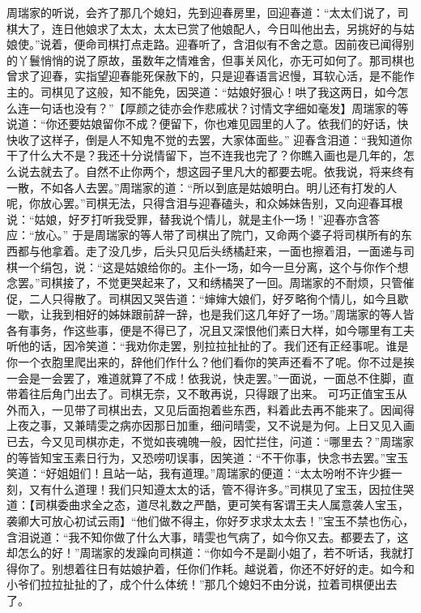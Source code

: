 \documentclass[12pt,oneside]{book}
\begin{document}
周瑞家的听说，会齐了那几个媳妇，先到迎春房里，回迎春道：“太太们说了，司棋大了，连日他娘求了太太，太太已赏了他娘配人，今日叫他出去，另挑好的与姑娘使。”说着，便命司棋打点走路。迎春听了，含泪似有不舍之意。因前夜已闻得别的丫鬟悄悄的说了原故，虽数年之情难舍，但事关风化，亦无可如何了。那司棋也曾求了迎春，实指望迎春能死保赦下的，只是迎春语言迟慢，耳软心活，是不能作主的。司棋见了这般，知不能免，因哭道：“姑娘好狠心！哄了我这两日，如今怎么连一句话也没有？”【厚颜之徒亦会作悲戚状？讨情文字细如毫发】周瑞家的等说道：“你还要姑娘留你不成？便留下，你也难见园里的人了。依我们的好话，快快收了这样子，倒是人不知鬼不觉的去罢，大家体面些。”
迎春含泪道：“我知道你干了什么大不是？我还十分说情留下，岂不连我也完了？你瞧入画也是几年的，怎么说去就去了。自然不止你两个，想这园子里凡大的都要去呢。依我说，将来终有一散，不如各人去罢。”周瑞家的道：“所以到底是姑娘明白。明儿还有打发的人呢，你放心罢。”司棋无法，只得含泪与迎春磕头，和众姊妹告别，又向迎春耳根说：“姑娘，好歹打听我受罪，替我说个情儿，就是主仆一场！”迎春亦含答应：“放心。”
于是周瑞家的等人带了司棋出了院门，又命两个婆子将司棋所有的东西都与他拿着。走了没几步，后头只见后头绣橘赶来，一面也擦着泪，一面递与司棋一个绢包，说：“这是姑娘给你的。主仆一场，如今一旦分离，这个与你作个想念罢。”司棋接了，不觉更哭起来了，又和绣橘哭了一回。周瑞家的不耐烦，只管催促，二人只得散了。司棋因又哭告道：“婶婶大娘们，好歹略徇个情儿，如今且歇一歇，让我到相好的姊妹跟前辞一辞，也是我们这几年好了一场。”周瑞家的等人皆各有事务，作这些事，便是不得已了，况且又深恨他们素日大样，如今哪里有工夫听他的话，因冷笑道：“我劝你走罢，别拉拉扯扯的了。我们还有正经事呢。谁是你一个衣胞里爬出来的，辞他们作什么？他们看你的笑声还看不了呢。你不过是挨一会是一会罢了，难道就算了不成！依我说，快走罢。”一面说，一面总不住脚，直带着往后角门出去了。司棋无奈，又不敢再说，只得跟了出来。
可巧正值宝玉从外而入，一见带了司棋出去，又见后面抱着些东西，料着此去再不能来了。因闻得上夜之事，又兼晴雯之病亦因那日加重，细问晴雯，又不说是为何。上日又见入画已去，今又见司棋亦走，不觉如丧魂魄一般，因忙拦住，问道：“哪里去？”周瑞家的等皆知宝玉素日行为，又恐唠叨误事，因笑道：“不干你事，快念书去罢。”宝玉笑道：“好姐姐们！且站一站，我有道理。”周瑞家的便道：“太太吩咐不许少捱一刻，又有什么道理！我们只知遵太太的话，管不得许多。”司棋见了宝玉，因拉住哭道：【司棋委曲求全之态，道尽礼数之严酷，更可笑有客谓王夫人属意袭人宝玉，袭卿大可放心初试云雨】“他们做不得主，你好歹求求太太去！”宝玉不禁也伤心，含泪说道：“我不知你做了什么大事，晴雯也气病了，如今你又去。都要去了，这却怎么的好！”周瑞家的发躁向司棋道：“你如今不是副小姐了，若不听话，我就打得你了。别想着往日有姑娘护着，任你们作耗。越说着，你还不好好的走。如今和小爷们拉拉扯扯的了，成个什么体统！”那几个媳妇不由分说，拉着司棋便出去了。
\end{document}

